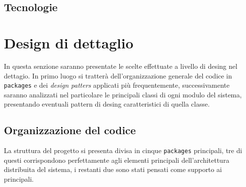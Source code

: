         \subsection{Tecnologie}\label{subsec:technologies}

        \clearpage

    \section{Design di dettaglio}\label{sec:details}

	In questa senzione saranno presentate le scelte effettuate a livello di desing nel dettagio. In primo luogo si tratterà dell'organizzazione generale del codice in \texttt{packages} e dei \textit{design patters} applicati più frequentemente, successivamente saranno analizzati nel particolare le principali classi di ogni modulo del sistema, presentando eventuali pattern di desing caratteristici di quella classe.

    \subsection {Organizzazione del codice}\label{subsec:details:codestructure}
    La struttura del progetto si presenta divisa in cinque \texttt{packages} principali, tre di questi corrispondono perfettamente agli elementi principali dell'architettura distribuita del sistema, i restanti due sono stati pensati come supporto ai principali.

